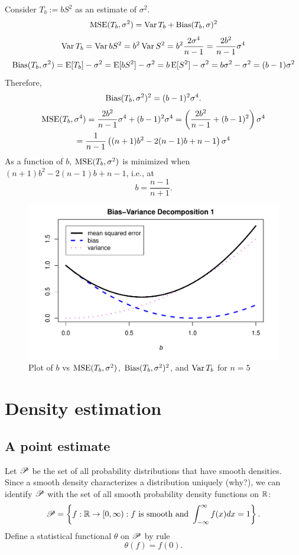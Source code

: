 \documentclass[12pt]{amsart}
\begin{document}
Consider $T_b:=bS^2$ as an estimate of $\sigma^2$.
\begin{align*}
    \operatorname{MSE}(T_b, \sigma^2) = \operatorname{Var} T_b + \operatorname{Bias}(T_b,\sigma)^2
\end{align*}
\[
    \operatorname{Var} T_b = \operatorname{Var} b S^2 = b^2\operatorname{Var} S^2 = b^2 \frac{2\sigma^4}{n-1} = \frac{2b^2}{n-1}\sigma^4
\]
\[
\operatorname{Bias}(T_b, \sigma^2) = \operatorname{E}[T_b] - \sigma^2 = 
\operatorname{E}[bS^2] - \sigma^2 = b\operatorname{E}[S^2] - \sigma^2 = b\sigma^2 - \sigma^2 = (b-1)\sigma^2
\]
Therefore,
\[
    \operatorname{Bias}(T_b, \sigma^2)^2 = (b-1)^2\sigma^4.
\]
\begin{multline*}
    \operatorname{MSE}(T_b, \sigma^4) = \frac{2b^2}{n-1}\sigma^4 + (b-1)^2\sigma^4
    = \left(\frac{2b^2}{n-1} + (b-1)^2\right)\sigma^4\\
    = \frac1{n-1}\left((n+1)b^2 -2(n-1)b + n-1\right)\sigma^4
\end{multline*}
As a function of $b$, $\operatorname{MSE}(T_b, \sigma^2)$ is minimized when
$(n+1)b^2 -2 (n-1)b + n-1$, i.e., at
\[
    b = \frac{n-1}{n+1}.
\]

\begin{figure}
    \includegraphics[scale=0.94]{bias-variance-decomposition-1.pdf}
    \caption{Plot of $b$ vs $\operatorname{MSE}(T_b, \sigma^2)$, $\operatorname{Bias}(T_b, \sigma^2)^2$, and $\operatorname{Var} T_b$ for $n=5$}
\end{figure}

\section{Density estimation}

\subsection{A point estimate}
Let $\mathscr{P}$ be the set of all probability distributions that have smooth densities.
Since a smooth density characterizes a distribution uniquely (why?),
we can identify $\mathscr{P}$ with the set of all smooth probability density functions on $\mathbb{R}$:
\[
    \mathscr{P} = \left\{f:\mathbb{R}\to [0,\infty) :
    \text{$f$ is smooth and } \int_{-\infty}^\infty f(x)dx=1\right\}.
\]
Define a statistical functional $\theta$ on $\mathscr{P}$ by rule
\[\theta(f)=f(0).\]
\end{document}
